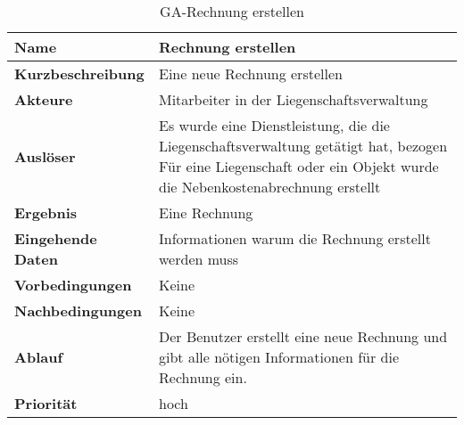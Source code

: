 \begin{table}[H]
  \centering
  \settowidth{}
  \setlength\extrarowheight{2pt}
  \begin{tabulary}{1.0\textwidth}{|a|m{12cm}|}
    \hline
    \textbf{Name}&Rechnung erstellen\\
    \hline 
    \textbf{Kurzbeschreibung} & Eine neue Rechnung erstellen\\
    \hline
    \textbf{Akteure} & Mitarbeiter in der Liegenschaftsverwaltung\\
    \hline
    \textbf{Auslöser} & Es wurde eine Dienstleistung, die die Liegenschaftsverwaltung getätigt hat, bezogen \newline 
    Für eine Liegenschaft oder ein Objekt wurde die Nebenkostenabrechnung erstellt\\
    \hline
    \textbf{Ergebnis} & Eine Rechnung\\
    \hline
    \textbf{Eingehende Daten} & Informationen warum die Rechnung erstellt werden muss \\
    \hline
    \textbf{Vorbedingungen} & Keine\\
    \hline
    \textbf{Nachbedingungen} & Keine\\
    \hline
    \textbf{Ablauf} & Der Benutzer erstellt eine neue Rechnung und gibt alle nötigen Informationen für die Rechnung ein.\\
    \hline
    \textbf{Priorität} & hoch\\
    \hline
  \end{tabulary}
  \caption{GA-Rechnung erstellen}
\end{table}

